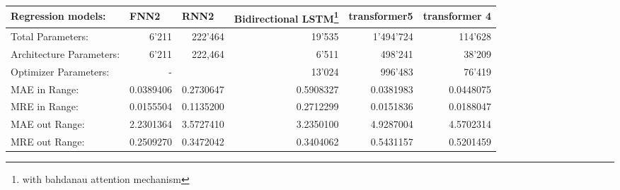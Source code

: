\documentclass{article}
\begin{document}
\begin{table}[htbp]
\begin{tabular}{|lr|r|r|r|r|r|}
\hline
\multicolumn{2}{|l|}{Regression models:}                              & \multicolumn{1}{l|}{FNN2} & \multicolumn{1}{l|}{RNN2} & \multicolumn{1}{l|}{Bidirectional   LSTM\footnote{with bahdanau attention mechanism}} & \multicolumn{1}{l|}{transformer5} & \multicolumn{1}{l|}{transformer 4} \\ \hline
\multicolumn{2}{|l|}{Total   Parameters:}                             & 6’211                     & 222’464                   & 19’535                                    & 1’494’724                         & 114’628                            \\
\multicolumn{2}{|l|}{Architecture   Parameters:}                      & 6’211                     & 222,464                   & 6’511                                     & 498’241                           & 38’209                             \\
\multicolumn{2}{|l|}{Optimizer   Parameters:}                         & -                         &                           & 13’024                                    & 996’483                           & 76’419                             \\
\rowcolor[HTML]{F7C7AC} 
MAE in Range:                              &                          & 0.0389406                 & 0.2730647                 & 0.5908327                                 & 0.0381983                         & 0.0448075                          \\
\rowcolor[HTML]{F7C7AC} 
MRE in Range:                              &                          & 0.0155504                 & 0.1135200                 & 0.2712299                                 & 0.0151836                         & 0.0188047                          \\
\rowcolor[HTML]{94DCF8} 
MAE out Range:                             &                          & 2.2301364                 & 3.5727410                 & 3.2350100                                 & 4.9287004                         & 4.5702314                          \\
\rowcolor[HTML]{94DCF8} 
MRE out Range:                             &                          & 0.2509270                 & 0.3472042                 & 0.3404062                                 & 0.5431157                         & 0.5201459                          \\

\end{tabular}
\end{table}
\end{document}

